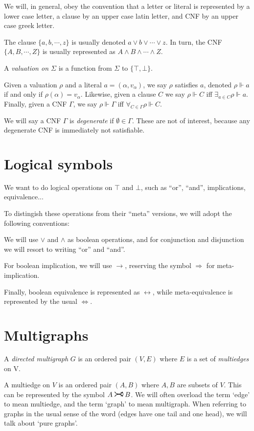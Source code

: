\documentclass[11pt]{article}
\newcommand{\sat}{\Vdash}
\newcommand{\rightcurvearrow}{
\mathrel{
  \begin{tikzpicture}[scale=0.8]
    \draw[thick,->] (0,1ex) arc (30:150:-2ex);
    \draw[thick,->] (0,-1ex) arc (150:30:2ex);
  \end{tikzpicture}
}
}
\begin{document}
We will, in general, obey the convention that a letter or literal is represented by a lower case letter, a clause by an upper case latin letter, and CNF by an upper case greek letter.

The clause $\{a,b,\cdots,z\}$ is usually denoted $a \vee b \vee \cdots \vee z$. In turn, the CNF $\{A, B, \cdots, Z\}$ is usually represented as $A \wedge B \wedge \cdots \wedge Z$.

A \emph{valuation on $\Sigma$} is a function from $\Sigma$ to $\{\top, \bot\}$.

Given a valuation $\rho$ and a literal $a = (\alpha, v_\alpha)$, we say $\rho$ satisfies $a$, denoted $\rho \sat a$ if and only if $\rho(\alpha) = v_\alpha$. Likewise, given a clause $C$ we say $\rho \sat C$ iff $\exists_{a \in C} \rho \sat a$. Finally, given a CNF $\Gamma$, we say $\rho \sat \Gamma$ iff $\forall_{C \in \Gamma} \rho \sat C$.

We will say a CNF $\Gamma$ is \emph{degenerate} if $\emptyset \in \Gamma$. These are not of interest, because any degenerate CNF is immediately not satisfiable.

\section{Logical symbols}

We want to do logical operations on $\top$ and $\bot$, such as ``or'', ``and'', implications, equivalence...

To distingish these operations from their ``meta'' versions, we will adopt the following conventions:

We will use $\vee$ and $\wedge$ as boolean operations, and for conjunction and disjunction we will resort to writing ``or'' and ``and''.

For boolean implication, we will use $\rightarrow$, reserving the symbol $\Rightarrow$ for meta-implication.

Finally, boolean equivalence is represented as $\leftrightarrow$, while meta-equivalence is represented by the usual $\Leftrightarrow$.


\section{Multigraphs}

A \emph{directed multigraph} $G$ is an ordered pair $(V, E)$ where $E$ is a set of \emph{multiedges} on V.

A multiedge on $V$ is an ordered pair $(A, B)$ where $A, B$ are subsets of $V$. This can be represented by the symbol $A \rightcurvearrow B$. We will often overload the term `edge' to mean multiedge, and the term `graph' to mean multigraph. When referring to graphs in the usual sense of the word (edges have one tail and one head), we will talk about `pure graphs'.
\end{document}
